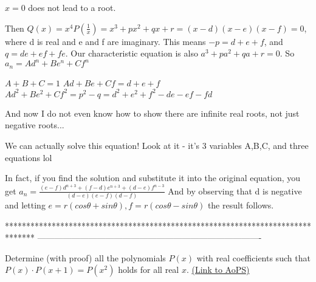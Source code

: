 \begin{solution}
	\begin{tcolorbox}$ x = 0$ does not lead to a root.

Then $ Q(x) = x^4P(\frac {1}{x}) = x^3 + px^2 + qx + r = (x - d)(x - e)(x - f) = 0$, where d is real and e and f are imaginary. This means $ - p = d + e + f$, and ${ q = de + ef + fe}$.
Our characteristic equation is also $ a^3 + pa^2 + qa + r = 0$. So $ a_n = Ad^n + Be^n + Cf^n$

$ A + B + C = 1$
$ Ad + Be + Cf = d + e + f$
$ Ad^2 + Be^2 + Cf^2 = p^2 - q = d^2 + e^2 + f^2 - de - ef - fd$

And now I do not even know how to show there are infinite real roots, not just negative roots...\end{tcolorbox}

We can actually solve this equation!
Look at it - it's 3 variables A,B,C, and three equations lol

In fact, if you find the solution and substitute it into the original equation,
you get $ a_n = \frac{(e-f)d^{n+3} + (f-d)e^{n+3} + (d-e)f^{n-3}}{(d-e)(e-f)(d-f)}$
And by observing that d is negative and letting $ e=r(cos\theta + sin\theta ), f=r(cos\theta - sin\theta )$ the result follows.
\end{solution}
*******************************************************************************
-------------------------------------------------------------------------------

\begin{problem}
	Determine (with proof) all the polynomials $ P(x)$ with real coefficients such that $ P(x) \cdot P(x+1)=P(x^2)$ holds for all real $x$.
	\flushright \href{https://artofproblemsolving.com/community/c6h273598}{(Link to AoPS)}
\end{problem}



